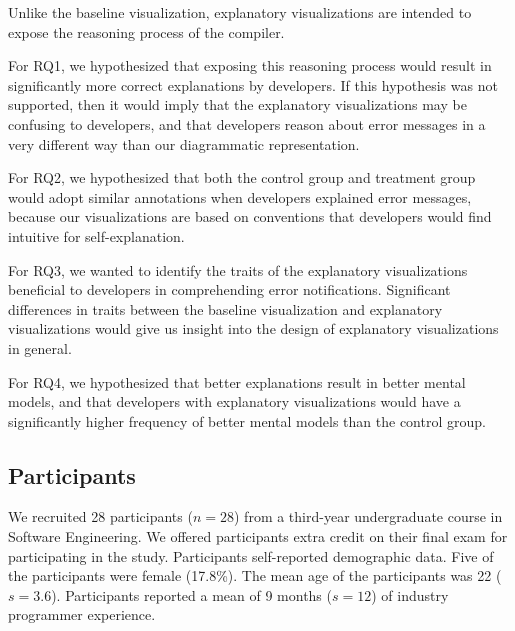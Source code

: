\documentclass[conference]{IEEEtran}
\begin{document}
Unlike the baseline visualization, explanatory visualizations are intended to expose the reasoning process of the compiler. 

For RQ1, we hypothesized that exposing this reasoning process would result in significantly more correct explanations by developers. If this hypothesis was not supported, then it would imply that the explanatory visualizations may be confusing to developers, and that developers reason about error messages in a very different way than our diagrammatic representation.

For RQ2, we hypothesized that both the control group and treatment group would adopt similar annotations when developers explained error messages, because our visualizations are based on conventions that developers would find intuitive for self-explanation.

For RQ3, we wanted to identify the traits of the explanatory visualizations beneficial to developers in comprehending error notifications. Significant differences in traits between the baseline visualization and explanatory visualizations would give us insight into the design of explanatory visualizations in general.

For RQ4, we hypothesized that better explanations result in better mental models, and that developers with explanatory visualizations would have a significantly higher frequency of better mental models than the control group.

\subsection{Participants}

We recruited 28 participants ($n = 28$) from a third-year undergraduate course in Software Engineering. We offered participants extra credit on their final exam for participating in the study. Participants self-reported demographic data. Five of the participants were female (17.8\%). The mean age of the participants was 22 ($s = 3.6$). Participants reported a mean of 9 months ($s = 12$) of industry programmer experience.

\end{document}
